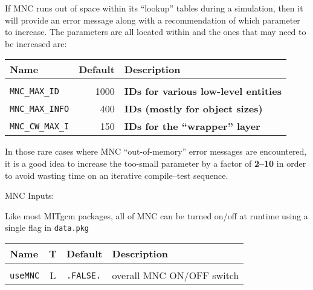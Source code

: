 If MNC runs out of space within its ``lookup'' tables during a
simulation, then it will provide an error message along with a
recommendation of which parameter to increase.  The parameters are all
located within 
and the ones that may need to be increased are:

\begin{center}
  {\footnotesize
    \begin{tabular}[htb]{|l|r|l|}\hline
      \textbf{Name}  &  
      \textbf{Default}  &  \textbf{Description}  \\\hline
      &  &  \\
      \texttt{MNC\_MAX\_ID}  &  1000  & 
      \textbf{IDs for various low-level entities}  \\
      \texttt{MNC\_MAX\_INFO}  &   400  & 
      \textbf{IDs (mostly for object sizes)}  \\
      \texttt{MNC\_CW\_MAX\_I}  &  150  & 
      \textbf{IDs for the ``wrapper'' layer}  \\\hline
    \end{tabular}
  }
\end{center}

In those rare cases where MNC ``out-of-memory'' error messages are
encountered, it is a good idea to increase the too-small parameter by
a factor of \textbf{2--10} in order to avoid wasting time on an
iterative compile--test sequence.


MNC Inputs:

Like most MITgcm packages, all of MNC can be turned on/off at runtime
using a single flag in \texttt{data.pkg}
\begin{center}
  {\footnotesize
    \begin{tabular}[htb]{|l|c|l|l|}\hline
      \textbf{Name}  &  \textbf{T}  &  
      \textbf{Default}  &  \textbf{Description}  \\\hline
      &  &  &  \\
      \texttt{useMNC}  &  L  & \texttt{.FALSE.}  &  
      overall MNC ON/OFF switch  \\\hline
    \end{tabular}
  }
\end{center}


